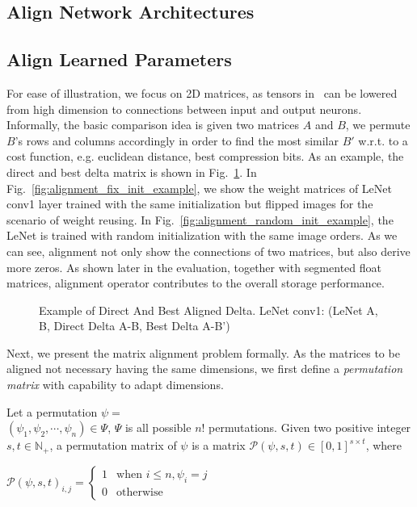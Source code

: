 \documentclass[conference]{IEEEtran}
\begin{document}
{\subsection{Align Network Architectures}
\huicomment{}


\subsection{Align Learned Parameters}
For ease of illustration, we focus on 2D matrices, as tensors in \dnn\ can be lowered from high dimension to connections between input and output neurons.
Informally, the basic comparison idea is given two matrices $A$ and $B$, we permute $B$'s rows and columns accordingly in order to find the most similar $B'$ w.r.t. to a cost function, e.g. euclidean distance, best compression bits. As an example, the direct and best delta matrix is shown in Fig.~\ref{fig:alignment_examples}. In Fig.~\ref{fig:alignment_fix_init_example}, we show the weight matrices of LeNet conv1 layer trained with the same initialization but flipped images for the scenario of weight reusing. In Fig.~\ref{fig:alignment_random_init_example}, the LeNet is trained with random initialization with the same image orders. As we can see, alignment not only show the connections of two matrices, but also derive more zeros. As shown later in the evaluation, together with segmented float matrices, alignment operator contributes to the overall storage performance.


\begin{figure}[!t]
\caption{Example of Direct And Best Aligned Delta. LeNet conv1: {\small{(LeNet A, B, Direct Delta A-B, Best Delta A-B')}}}
\label{fig:alignment_examples}
\end{figure}






Next, we present the matrix alignment problem formally. As the matrices to be aligned not necessary having the same dimensions, we first define a \emph{permutation matrix} with capability to adapt dimensions.


\begin{definition}
Let a permutation $\mathbb{\psi} =$\\ $ (\psi_1, \psi_2, \cdots, \psi_n) \in \Psi$, $\Psi$ is all possible $n!$ permutations. Given two positive integer $s,t\in \mathbb{N}_+$, a permutation matrix of $\psi$ is a matrix $\mathcal{P}(\psi,s,t) \in [0,1]^{s \times t}$, where
\begin{center}
$\mathcal{P}(\psi,s,t)_{i,j} = \begin{cases}
1 &\text{when\ } i \leq n, \psi_i = j\\
0 &\text{otherwise}
\end{cases}$
\end{center}
\end{definition}


}
\end{document}
